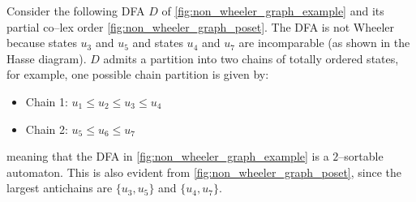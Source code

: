 \begin{example} \label{ex:p-sortable}
    Consider the following DFA $D$ of \cref{fig:non_wheeler_graph_example} and its partial co--lex order \cref{fig:non_wheeler_graph_poset}. The DFA is not Wheeler because states $u_3$ and $u_5$ and states $u_4$ and $u_7$ are incomparable (as shown in the Hasse diagram). $D$ admits a partition into two chains of totally ordered states, for example, one possible chain partition is given by:
    \begin{itemize}
        \item Chain 1: $u_1 \leq u_2 \leq u_3 \leq u_4$
        \item Chain 2: $u_5 \leq u_6 \leq u_7$
    \end{itemize}
    meaning that the DFA in \cref{fig:non_wheeler_graph_example} is a $2$--sortable automaton. 
    This is also evident from \cref{fig:non_wheeler_graph_poset}, since the largest antichains are $\{u_3, u_5\}$ and $\{u_4, u_7\}$.

    \begin{figure}[H]
        \centering
        \begin{subfigure}[b]{0.6\textwidth}
            \centering
\end{subfigure}
\end{figure}
\end{example}
